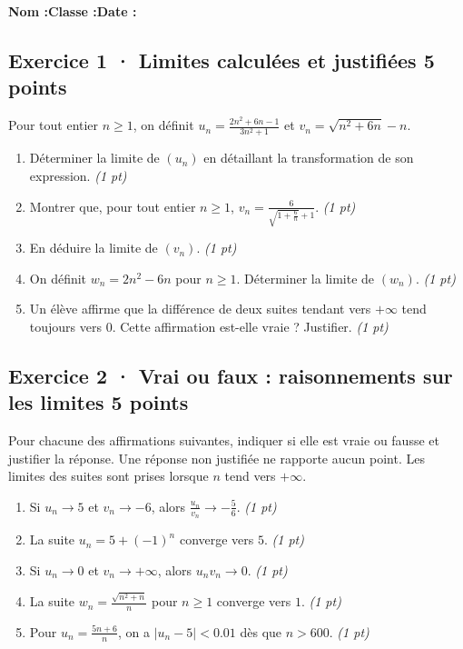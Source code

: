\smallskip\textbf{Nom :}\enspace\dotfill\quad\textbf{Classe :}\enspace\dotfill\quad\textbf{Date :}\enspace\dotfill

\subsection*{Exercice 1 · Limites calculées et justifiées \hfill 5 points}Pour tout entier $n\ge1$, on définit $u_n=\frac{2n^2+6n-1}{3n^2+1}$ et $v_n=\sqrt{n^2+6n}-n$.

\begin{enumerate}

\item Déterminer la limite de $(u_n)$ en détaillant la transformation de son expression. \hfill\textit{(1 pt)}

\item Montrer que, pour tout entier $n\ge1$, $v_n=\frac{6}{\sqrt{1+\frac{6}n}+1}$. \hfill\textit{(1 pt)}

\item En déduire la limite de $(v_n)$. \hfill\textit{(1 pt)}

\item On définit $w_n=2n^2-6n$ pour $n\ge1$. Déterminer la limite de $(w_n)$. \hfill\textit{(1 pt)}

\item Un élève affirme que la différence de deux suites tendant vers $+\infty$ tend toujours vers $0$. Cette affirmation est-elle vraie ? Justifier. \hfill\textit{(1 pt)}

\end{enumerate}

\subsection*{Exercice 2 · Vrai ou faux : raisonnements sur les limites \hfill 5 points}Pour chacune des affirmations suivantes, indiquer si elle est vraie ou fausse et justifier la réponse. Une réponse non justifiée ne rapporte aucun point. Les limites des suites sont prises lorsque $n$ tend vers $+\infty$.

\begin{enumerate}

\item Si $u_n\to 5$ et $v_n\to-6$, alors $\frac{u_n}{v_n}\to-\frac{5}{6}$. \hfill\textit{(1 pt)}

\item La suite $u_n=5+(-1)^n$ converge vers $5$. \hfill\textit{(1 pt)}

\item Si $u_n\to0$ et $v_n\to+\infty$, alors $u_nv_n\to0$. \hfill\textit{(1 pt)}

\item La suite $w_n=\frac{\sqrt{n^2+n}}{n}$ pour $n\ge1$ converge vers $1$. \hfill\textit{(1 pt)}

\item Pour $u_n=\frac{5n+6}{n}$, on a $|u_n-5|<\num{0,01}$ dès que $n> 600$. \hfill\textit{(1 pt)}

\end{enumerate}

